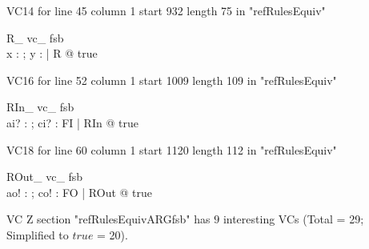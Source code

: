 \documentclass{article}
\begin{document}
VC14 for line 45 column 1 start 932 length 75 in "refRulesEquiv"
\begin{theorem}{ R\_ vc\_ fsb}\\
 \exists x : \power \nat ; y : \seq \nat | R @ true \\

\end{theorem}

VC16 for line 52 column 1 start 1009 length 109 in "refRulesEquiv"
\begin{theorem}{ RIn\_ vc\_ fsb}\\
 \exists ai? : \nat ; ci? : FI | RIn @ true \\

\end{theorem}

VC18 for line 60 column 1 start 1120 length 112 in "refRulesEquiv"
\begin{theorem}{ ROut\_ vc\_ fsb}\\
 \exists ao! : \nat ; co! : FO | ROut @ true \\

\end{theorem}



 VC Z section "refRulesEquivARGfsb" has $9$ interesting VCs (Total = 29; Simplified to $true$ = 20).



\end{document}
